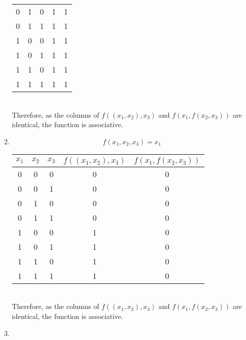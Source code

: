 \documentclass[fleqn, a4paper, 11pt, oneside]{amsart}
\theoremstyle{definition}
\theoremstyle{theorem}
\theoremstyle{remark}
\begin{document}
\begin{solution}
\begin{enumerate}
\begin{tabular}{|c|c|c||c|c|}
				0     & 1     & 0     & 1                  & 1                   \\
				0     & 1     & 1     & 1                  & 1                   \\
				1     & 0     & 0     & 1                  & 1                   \\
				1     & 0     & 1     & 1                  & 1                   \\
				1     & 1     & 0     & 1                  & 1                   \\
				1     & 1     & 1     & 1                  & 1                   \\
				\hline
			\end{tabular}\\
			Therefore, as the columns of $f((x_1,x_2),x_3)$ and $f(x_1,f(x_2,x_3))$ are identical, the function is associative.\\
		\item
			\begin{equation*}
				f(x_1,x_2,x_3) = x_1
			\end{equation*}
			\begin{tabular}{|c|c|c||c|c|}
				\hline
				$x_1$ & $x_2$ & $x_3$ & $f((x_1,x_2),x_3)$ & $f(x_1,f(x_2,x_3))$ \\
				\hline
				0     & 0     & 0     & 0                  & 0                   \\
				0     & 0     & 1     & 0                  & 0                   \\
				0     & 1     & 0     & 0                  & 0                   \\
				0     & 1     & 1     & 0                  & 0                   \\
				1     & 0     & 0     & 1                  & 0                   \\
				1     & 0     & 1     & 1                  & 0                   \\
				1     & 1     & 0     & 1                  & 0                   \\
				1     & 1     & 1     & 1                  & 0                   \\
				\hline
			\end{tabular}\\
			Therefore, as the columns of $f((x_1,x_2),x_3)$ and $f(x_1,f(x_2,x_3))$ are identical, the function is associative.\\
		\item
			\begin{equation*}

\end{equation*}
\end{enumerate}
\end{solution}
\end{document}
